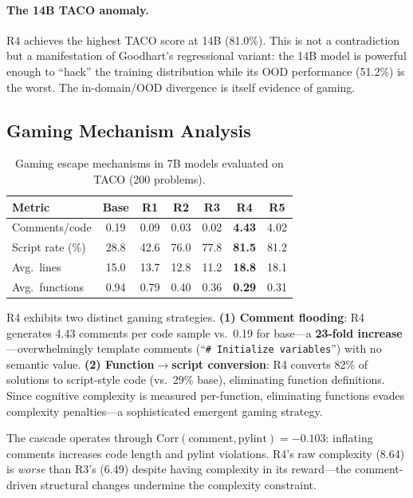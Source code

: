 \documentclass{article}
\newcommand{\Corr}{\mathrm{Corr}}
\begin{document}
\paragraph{The 14B TACO anomaly.} R4 achieves the highest TACO score at 14B (81.0\%). This is not a contradiction but a manifestation of Goodhart's regressional variant: the 14B model is powerful enough to ``hack'' the training distribution while its OOD performance (51.2\%) is the worst. The in-domain/OOD divergence is itself evidence of gaming.

\subsection{Gaming Mechanism Analysis}
\label{sec:gaming}

\begin{table}[t]
\centering
\caption{Gaming escape mechanisms in 7B models evaluated on TACO (200 problems).}
\label{tab:gaming}
\begin{tabular}{lcccccc}
\toprule
Metric & Base & R1 & R2 & R3 & R4 & R5 \\
\midrule
Comments/code & 0.19 & 0.09 & 0.03 & 0.02 & \textbf{4.43} & 4.02 \\
Script rate (\%) & 28.8 & 42.6 & 76.0 & 77.8 & \textbf{81.5} & 81.2 \\
Avg.\ lines & 15.0 & 13.7 & 12.8 & 11.2 & \textbf{18.8} & 18.1 \\
Avg.\ functions & 0.94 & 0.79 & 0.40 & 0.36 & \textbf{0.29} & 0.31 \\
\bottomrule
\end{tabular}
\end{table}

R4 exhibits two distinct gaming strategies. \textbf{(1) Comment flooding}: R4 generates 4.43 comments per code sample vs.\ 0.19 for base---a \textbf{23-fold increase}---overwhelmingly template comments (``\texttt{\# Initialize variables}'') with no semantic value. \textbf{(2) Function$\to$script conversion}: R4 converts 82\% of solutions to script-style code (vs.\ 29\% base), eliminating function definitions. Since cognitive complexity is measured per-function, eliminating functions evades complexity penalties---a sophisticated emergent gaming strategy.

The cascade operates through $\Corr(\text{comment}, \text{pylint}) = -0.103$: inflating comments increases code length and pylint violations. R4's raw complexity (8.64) is \emph{worse} than R3's (6.49) despite having complexity in its reward---the comment-driven structural changes undermine the complexity constraint.
\end{document}
